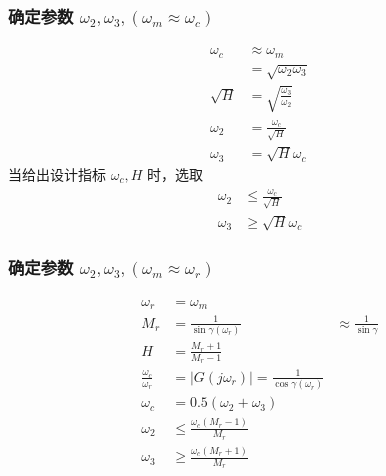 \documentclass[table]{article}
\begin{document}
\begin{frame}
\frametitle{确定参数 $\omega_2,\omega_3,(\omega_m\approx\omega_c)$}
\label{sec-5-1-4}

\begin{align*}
\omega_c &\approx\omega_m \\
         &=\sqrt{\omega_2\omega_3}\\
\sqrt{H} &=\sqrt{\frac{\omega_3}{\omega_2}}\\
\omega_2 & = \frac{\omega_c}{\sqrt{H}} \\
\omega_3 & = \sqrt{H}\omega_c
\end{align*}
当给出设计指标 $\omega_c,H$ 时，选取
\begin{align*}
\omega_2 &\leq \frac{\omega_c}{\sqrt{H}} \\
\omega_3 &\geq \sqrt{H}\omega_c
\end{align*}
\end{frame}
\begin{frame}
\frametitle{确定参数 $\omega_2,\omega_3,(\omega_m\approx\omega_r)$}
\label{sec-5-1-5}

\begin{align*}
\omega_r &=\omega_m \\
M_r &=\frac{1}{\sin\gamma(\omega_r)}&\approx \frac{1}{\sin\gamma} \\
H &=\frac{M_r+1}{M_r-1}\\
\frac{\omega_c}{\omega_r} &=|G(j\omega_r)|=\frac{1}{\cos\gamma(\omega_r)}\\
\omega_c &=0.5(\omega_2+\omega_3)\\
\omega_2 & \leq \frac{\omega_c(M_r-1)}{M_r} \\
\omega_3 & \geq \frac{\omega_c(M_r+1)}{M_r} 
\end{align*}
\end{frame}
\end{document}
